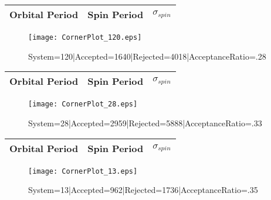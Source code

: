 \documentclass[10pt]{article}
\begin{document}
\begin{center}
        \begin{tabular}{|c|c|c|}
        \hline
Orbital Period & Spin Period & $\sigma_{spin}$ \\
 \hline
        \end{tabular}
        \end{center}
\begin{figure}[h] 
        \texttt{[image: CornerPlot\_120.eps]}
        \caption{System=120|Accepted=1640|Rejected=4018|AcceptanceRatio=.28}
        \label{S120}
        \centering
        \end{figure}
\begin{center}
        \begin{tabular}{|c|c|c|}
        \hline
Orbital Period & Spin Period & $\sigma_{spin}$ \\
 \hline
        \end{tabular}
        \end{center}
\begin{figure}[h] 
        \texttt{[image: CornerPlot\_28.eps]}
        \caption{System=28|Accepted=2959|Rejected=5888|AcceptanceRatio=.33}
        \label{S28}
        \centering
        \end{figure}
\begin{center}
        \begin{tabular}{|c|c|c|}
        \hline
Orbital Period & Spin Period & $\sigma_{spin}$ \\
 \hline
        \end{tabular}
        \end{center}
\begin{figure}[h] 
        \texttt{[image: CornerPlot\_13.eps]}
        \caption{System=13|Accepted=962|Rejected=1736|AcceptanceRatio=.35}
        \label{S13}
        \centering
        \end{figure}
\end{document}
